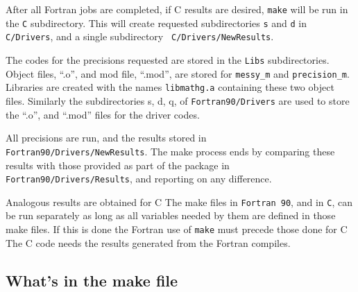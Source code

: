 \documentclass[12pt]{article}
\begin{document}
After all Fortran jobs are completed, if C results are desired, {\tt make} will
be run in the {\tt C} subdirectory.  This will create requested subdirectories
{\tt s} and {\tt d} in {\tt C/Drivers}, and a single subdirectory {\tt
  C/Drivers/NewResults}.

The codes for the precisions requested are stored in the {\tt Libs}
subdirectories.  Object files, ``.o'', and mod file, ``.mod'', are stored for
{\tt messy\_m} and {\tt precision\_m}.  Libraries are created with the names
{\tt libmathg.a} containing these two object files.  Similarly the
subdirectories s, d, q, of {\tt Fortran90/Drivers} are used to store the ``.o'',
and ``.mod'' files for the driver codes.

All precisions are run, and the results stored in {\tt
  Fortran90/Drivers/NewResults}.  The make process ends by comparing these
results with those provided as part of the package in {\tt
  Fortran90/Drivers/Results}, and reporting on any difference.

Analogous results are obtained for C  The make files in
{\tt Fortran 90}, and in {\tt C}, can be run separately as long as all variables
needed by them are defined in those make files.  If this is done the
Fortran use of {\tt make} must precede those done for C  The C code needs the
results generated from the Fortran compiles.

\subsection{What\rq{}s in the make file}
\end{document}
